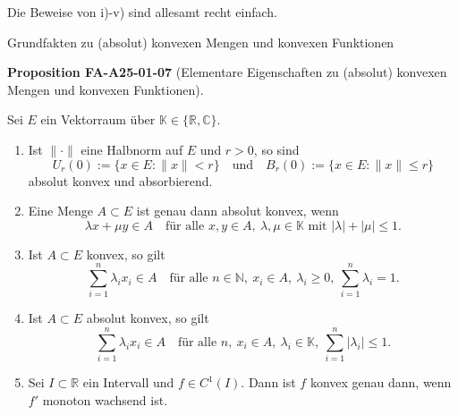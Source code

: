 \documentclass[10pt, letterpaper]{article}
\newcommand{\CustomHeading}[3]{%
  \par\medskip\noindent%
  \textbf{#1 #2} \textnormal{(#3)}.\enskip%
}
\newenvironment{PROP}[2]{\begin{unitbox}\CustomHeading{Proposition}{#1}{#2}}{\end{unitbox}}
\begin{document}
Die Beweise von i)-v) sind allesamt recht einfach.



Grundfakten zu (absolut) konvexen Mengen und konvexen Funktionen


\begin{PROP}{FA-A25-01-07}{Elementare Eigenschaften zu (absolut) konvexen Mengen und konvexen Funktionen}
Sei $E$ ein Vektorraum über $\mathbb{K}\in\{\mathbb{R},\mathbb{C}\}$.
\begin{enumerate}
\item Ist $\|\cdot\|$ eine Halbnorm auf $E$ und $r>0$, so sind
\[
U_{r}(0):=\{x\in E:\|x\|<r\}
\quad\text{und}\quad
B_{r}(0):=\{x\in E:\|x\|\le r\}
\]
absolut konvex und absorbierend.
\item Eine Menge $A\subset E$ ist genau dann absolut konvex, wenn
\[
\lambda x+\mu y\in A \quad\text{für alle }x,y\in A,\ \lambda,\mu\in\mathbb{K}\text{ mit }|\lambda|+|\mu|\le 1.
\]
\item Ist $A\subset E$ konvex, so gilt
\[
\sum_{i=1}^{n}\lambda_i x_i\in A
\quad\text{für alle }n\in\mathbb{N},\ x_i\in A,\ \lambda_i\ge 0,\ \sum_{i=1}^{n}\lambda_i=1.
\]
\item Ist $A\subset E$ absolut konvex, so gilt
\[
\sum_{i=1}^{n}\lambda_i x_i\in A
\quad\text{für alle }n,\ x_i\in A,\ \lambda_i\in\mathbb{K},\ \sum_{i=1}^{n}|\lambda_i|\le 1.
\]
\item Sei $I\subset\mathbb{R}$ ein Intervall und $f\in C^{1}(I)$. 
Dann ist $f$ konvex genau dann, wenn $f'$ monoton wachsend ist.
\end{enumerate}
\end{PROP}
\end{document}
